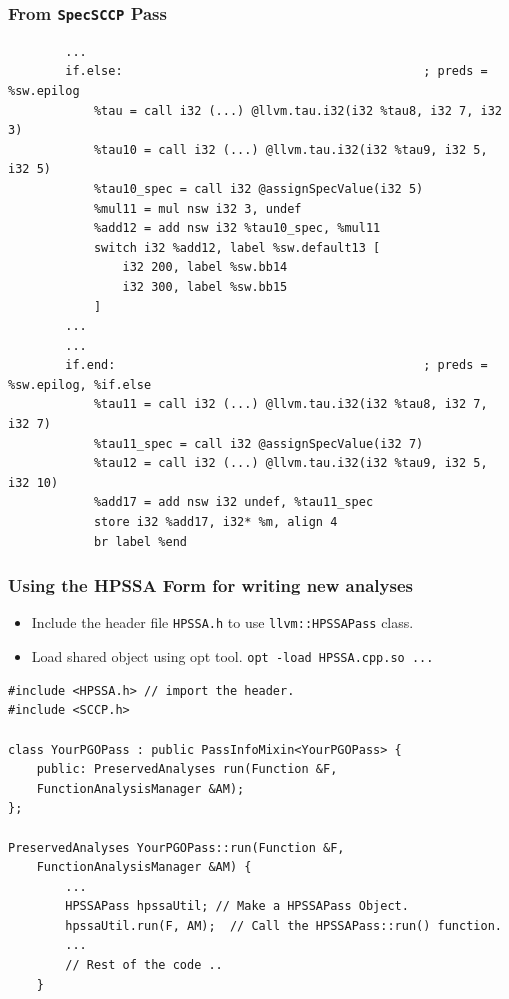 \documentclass[aspectratio=169, compress]{beamer}
\begin{document}
\begin{frame}[fragile]
	\frametitle{From \texttt{SpecSCCP} Pass}
	\begin{verbatim}
		...
		if.else:                                          ; preds = %sw.epilog
			%tau = call i32 (...) @llvm.tau.i32(i32 %tau8, i32 7, i32 3)
			%tau10 = call i32 (...) @llvm.tau.i32(i32 %tau9, i32 5, i32 5)	
			%tau10_spec = call i32 @assignSpecValue(i32 5)
			%mul11 = mul nsw i32 3, undef
			%add12 = add nsw i32 %tau10_spec, %mul11
			switch i32 %add12, label %sw.default13 [
				i32 200, label %sw.bb14
				i32 300, label %sw.bb15
			]
		...
		...
		if.end:                                           ; preds = %sw.epilog, %if.else
			%tau11 = call i32 (...) @llvm.tau.i32(i32 %tau8, i32 7, i32 7)
			%tau11_spec = call i32 @assignSpecValue(i32 7)
			%tau12 = call i32 (...) @llvm.tau.i32(i32 %tau9, i32 5, i32 10)
			%add17 = add nsw i32 undef, %tau11_spec
			store i32 %add17, i32* %m, align 4
			br label %end
	\end{verbatim}
\end{frame}
\begin{frame}[fragile]
	\frametitle{Using the HPSSA Form for writing new analyses}
	\begin{itemize}
		\item Include the header file \texttt{HPSSA.h} to use  \texttt{llvm::HPSSAPass} class.
		\item Load shared object using opt tool. \texttt{opt -load HPSSA.cpp.so ...} 
	\end{itemize}
	\begin{verbatim}
#include <HPSSA.h> // import the header.
#include <SCCP.h>

class YourPGOPass : public PassInfoMixin<YourPGOPass> {
	public: PreservedAnalyses run(Function &F, 
	FunctionAnalysisManager &AM);
};

PreservedAnalyses YourPGOPass::run(Function &F, 
	FunctionAnalysisManager &AM) {
		...
		HPSSAPass hpssaUtil; // Make a HPSSAPass Object.
		hpssaUtil.run(F, AM);  // Call the HPSSAPass::run() function.
		...
		// Rest of the code ..
	}
	\end{verbatim}
\end{frame}
\end{document}
